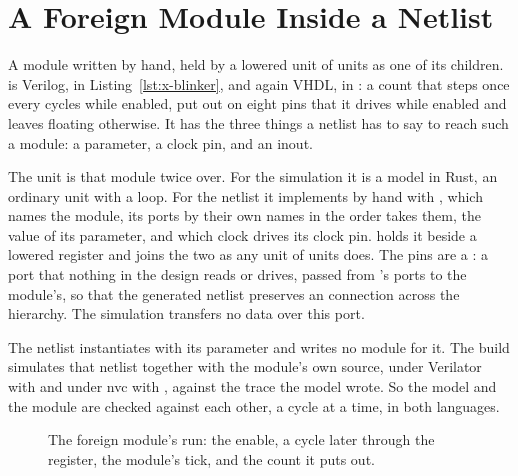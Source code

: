 \section{A Foreign Module Inside a Netlist}
\label{sec:x-blackbox}

A module written by hand, held by a lowered unit of units as one of
its children.  is Verilog, in
Listing~\ref{lst:x-blinker}, and again VHDL, in :
a count that steps once every  cycles while enabled,
put out on eight pins that it drives while enabled and leaves
floating otherwise. It has the three things a netlist has to say to
reach such a module: a parameter, a clock pin, and an inout.

The unit  is that module twice over. For the
simulation it is a model in Rust, an ordinary unit with a loop. For
the netlist it implements  by hand with ,
which names the module, its ports by their own names in the order
 takes them, the value of its parameter, and which clock
drives its clock pin.  holds it beside a lowered register
and joins the two as any unit of units does. The pins are a
: a port that nothing in the design reads or drives, passed
from 's ports to the module's, so that the generated netlist
preserves an  connection across the hierarchy. The simulation
transfers no data over this port.

The netlist instantiates  with its parameter and writes
no module for it. The build simulates that netlist together with the
module's own source, under Verilator with  and under
nvc with , against the trace the model wrote. So
the model and the module are checked against each other, a cycle at
a time, in both languages.

\begin{figure}[htbp]
\centering

\caption{The foreign module's run: the enable, a cycle later through
the register, the module's tick, and the count it puts out.}
\label{fig:x-blackbox}
\end{figure}






